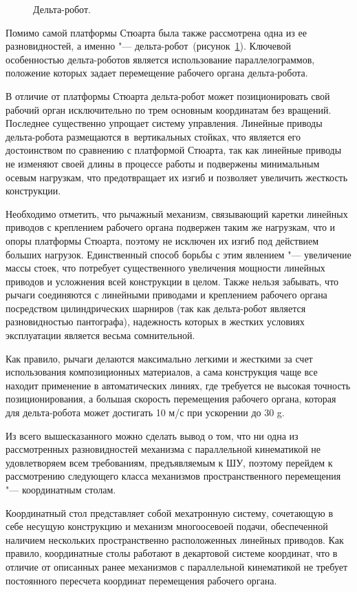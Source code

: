 \begin{figure}[ht]
	\caption{Дельта-робот.}\label{fig:delta}
\end{figure}

Помимо самой платформы Стюарта была также рассмотрена одна из ее разновидностей, а именно "--- дельта-робот~(рисунок~\cref{fig:delta}). Ключевой особенностью дельта-роботов является использование параллелограммов, положение которых задает перемещение рабочего органа дельта-робота.

В отличие от платформы Стюарта дельта-робот может позиционировать свой рабочий орган исключительно по трем основным координатам без вращений. Последнее существенно упрощает систему управления. Линейные приводы дельта-робота размещаются в~вертикальных стойках, что является его достоинством по сравнению с платформой Стюарта, так как линейные приводы не изменяют своей длины в процессе работы и подвержены минимальным осевым нагрузкам, что предотвращает их изгиб и позволяет увеличить жесткость конструкции.

Необходимо отметить, что рычажный механизм, связывающий каретки линейных приводов с креплением рабочего органа подвержен таким же нагрузкам, что и опоры платформы Стюарта, поэтому не исключен их изгиб под действием больших нагрузок. Единственный способ борьбы с этим явлением "--- увеличение массы стоек, что потребует существенного увеличения мощности линейных приводов и усложнения всей конструкции в целом. Также нельзя забывать, что рычаги соединяются с линейными приводами и креплением рабочего органа посредством цилиндрических шарниров (так как дельта-робот является разновидностью пантографа), надежность которых в жестких условиях эксплуатации является весьма сомнительной.

Как правило, рычаги делаются максимально легкими и жесткими за счет использования композиционных материалов, а сама конструкция чаще все находит применение в автоматических линиях, где требуется не высокая точность позиционирования, а большая скорость перемещения рабочего органа, которая для дельта-робота может достигать 10 м/с при ускорении до 30 g.

Из всего вышесказанного можно сделать вывод о том, что ни одна из рассмотренных разновидностей механизма с параллельной кинематикой не удовлетворяем всем требованиям, предъявляемым к ШУ, поэтому перейдем к рассмотрению следующего класса механизмов пространственного перемещения "--- координатным столам.

Координатный стол представляет собой мехатронную систему, сочетающую в себе несущую конструкцию и механизм многоосевоей подачи, обеспеченной наличием нескольких пространственно расположенных линейных приводов. Как правило, координатные столы работают в декартовой системе координат, что в отличие от описанных ранее механизмов с параллельной кинематикой не требует постоянного пересчета координат перемещения рабочего органа.

